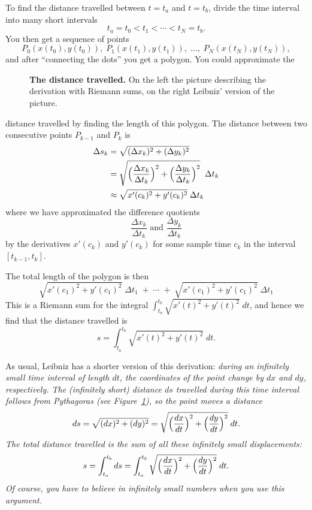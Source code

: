 To find the distance travelled between $t=t_a$ and $t=t_b$, divide the time
interval into many short intervals
\[
t_a=t_0<t_1<\cdots<t_N=t_b.
\]
You then get a sequence of points
\[
P_0(x(t_0), y(t_0)),\; P_1(x(t_1), y(t_1)),\; \ldots,\; P_N(x(t_N), y(t_N)),
\]
and after ``connecting the dots'' you get a polygon.  You could approximate the
\begin{figure}[ht]
  \centering
  \parbox{178pt}{{}}
  \parbox{178pt}{{}}
  \caption{\textbf{The distance travelled. } On the left the picture describing
    the derivation with Riemann sums, on the right Leibniz' version of the
    picture.}
  \label{fig:09arclength}
\end{figure}
distance travelled by finding the length of this polygon.  The distance between
two consecutive points $P_{k-1}$ and $P_k$ is
\begin{align*}
  \Delta s_k
  &= \sqrt{(\Delta x_k)^2 + (\Delta y_k)^2}\\
  &= \sqrt{\Bigl(\frac{\Delta x_k}{\Delta t_k}\Bigr)^2 + \Bigl(\frac{\Delta
      y_k}{\Delta t_k}\Bigr)^2}
  \;\; \Delta t_k\\
  &\approx \sqrt{x'(c_k)^2 + y'(c_k)^2}\; \Delta t_k
\end{align*}
where we have approximated the difference quotients
\[
\frac{\Delta x_k}{\Delta t_k} \text{ and } \frac{\Delta y_k}{\Delta t_k}
\]
by the derivatives $x'(c_k)$ and $y'(c_k)$ for some sample time $c_k$ in the
interval $[t_{k-1}, t_k]$.

The total length of the polygon is then
\[
\sqrt{x'(c_1)^2 + y'(c_1)^2}\; \Delta t_1 \; +\; \cdots \; + \; \sqrt{x'(c_1)^2
  + y'(c_1)^2}\; \Delta t_1
\]
This is a Riemann sum for the integral $\int_{t_a}^{t_b} \sqrt{x'(t)^2 +
  y'(t)^2} \;dt$, and hence we find that the distance travelled is
\begin{equation}
  s=\int_{t_a}^{t_b} \sqrt{x'(t)^2 + y'(t)^2} \;dt.
  \label{eq:09distance-travelled}
\end{equation}

As usual, Leibniz has a shorter version of this derivation: \itshape%
during an infinitely small time interval of length $dt$, the coordinates of the
point change by $dx$ and $dy$, respectively.  The (infinitely short) distance
$ds$ travelled during this time interval follows from Pythagoras (see
Figure~\ref{fig:09arclength}), so the point moves a distance
\[
ds = \sqrt{(dx)^2 + (dy)^2} = \sqrt{\Bigl(\frac{dx}{dt}\Bigr)^2 +
  \Bigl(\frac{dy}{dt}\Bigr)^2} \; dt.
\]
The total distance travelled is the sum of all these infinitely small
displacements:
\[
s= \int_{t_a}^{t_b} ds = \int_{t_a}^{t_b} \sqrt{\Bigl(\frac{dx}{dt}\Bigr)^2 +
  \Bigl(\frac{dy}{dt}\Bigr)^2} \; dt.
\]%
\upshape%
Of course, you have to believe in infinitely small numbers when you use this
argument.

